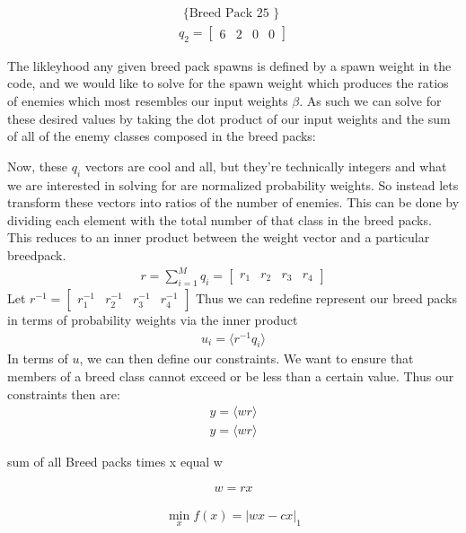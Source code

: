 \documentclass[12pt]{article}
\begin{document}
\begin{align*}
\text{ \{Breed Pack 25 \}} \\ 
q_2 = \begin{bmatrix}
6 & 2 & 0 & 0
\end{bmatrix}
\end{align*}


The likleyhood any given breed pack spawns is defined by a spawn weight in the code, and we would like to solve for the spawn weight which produces the ratios of enemies which most resembles our input weights $\beta$. As such we can solve for these desired values by taking the dot product of our input weights and the sum of all of the enemy classes composed in the breed packs:

Now, these $q_i$ vectors are cool and all, but they're technically integers and what we are interested in solving for are normalized probability weights. So instead lets transform these vectors into ratios of the number of enemies. This can be done by dividing each element with the total number of that class in the breed packs. This reduces to an inner product between the weight vector and a particular breedpack.
\begin{align*}
r = \sum_{i=1}^{M} q_i = \begin{bmatrix}
r_1 & r_2 & r_3 & r_4
\end{bmatrix}
\end{align*}
Let $r^{-1}=\begin{bmatrix}
r_1^{-1} & r_2^{-1} & r_3^{-1} & r_4^{-1}
\end{bmatrix}$
Thus we can redefine represent our breed packs in terms of probability weights via the inner product
\begin{align*}
u_i = \langle r^{-1} q_i \rangle
\end{align*}
In terms of $u$, we can then define our constraints. We want to ensure that members of a breed class cannot exceed or be less than a certain value.
Thus our constraints then are:
\begin{align*}
y=\langle w r \rangle
\end{align*}
\begin{align*}
y=\langle w r \rangle
\end{align*}

sum of all Breed packs times x equal w

\begin{align*}
w=r x
\end{align*}

\begin{align*}
\min_{x} f(x) = |wx-cx|_1
\end{align*}
\end{document}
